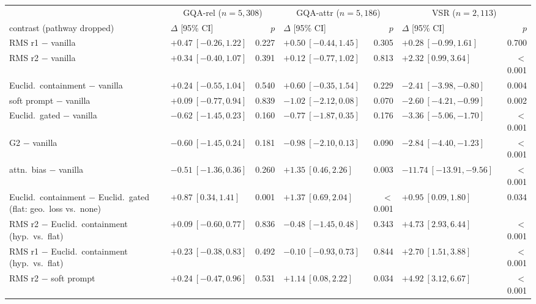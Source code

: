 \begin{tabular}{@{}l lr lr lr@{}}
\toprule
 & \multicolumn{2}{c}{GQA-rel ($n{=}5{,}308$)} & \multicolumn{2}{c}{GQA-attr ($n{=}5{,}186$)} & \multicolumn{2}{c}{VSR ($n{=}2{,}113$)} \\
\cmidrule(lr){2-3}\cmidrule(lr){4-5}\cmidrule(lr){6-7}
contrast (pathway dropped) & $\Delta$ [95\% CI] & $p$ & $\Delta$ [95\% CI] & $p$ & $\Delta$ [95\% CI] & $p$ \\
\midrule
RMS r1 $-$ vanilla & $+0.47\ [-0.26, 1.22]$ & 0.227 & $+0.50\ [-0.44, 1.45]$ & 0.305 & $+0.28\ [-0.99, 1.61]$ & 0.700 \\
RMS r2 $-$ vanilla & $+0.34\ [-0.40, 1.07]$ & 0.391 & $+0.12\ [-0.77, 1.02]$ & 0.813 & $+2.32\ [0.99, 3.64]$ & $<$0.001 \\
Euclid.\ containment $-$ vanilla & $+0.24\ [-0.55, 1.04]$ & 0.540 & $+0.60\ [-0.35, 1.54]$ & 0.229 & $-2.41\ [-3.98, -0.80]$ & 0.004 \\
soft prompt $-$ vanilla & $+0.09\ [-0.77, 0.94]$ & 0.839 & $-1.02\ [-2.12, 0.08]$ & 0.070 & $-2.60\ [-4.21, -0.99]$ & 0.002 \\
Euclid.\ gated $-$ vanilla & $-0.62\ [-1.45, 0.23]$ & 0.160 & $-0.77\ [-1.87, 0.35]$ & 0.176 & $-3.36\ [-5.06, -1.70]$ & $<$0.001 \\
G2 $-$ vanilla & $-0.60\ [-1.45, 0.24]$ & 0.181 & $-0.98\ [-2.10, 0.13]$ & 0.090 & $-2.84\ [-4.40, -1.23]$ & $<$0.001 \\
attn.\ bias $-$ vanilla & $-0.51\ [-1.36, 0.36]$ & 0.260 & $+1.35\ [0.46, 2.26]$ & 0.003 & $-11.74\ [-13.91, -9.56]$ & $<$0.001 \\
Euclid.\ containment $-$ Euclid.\ gated (flat: geo.\ loss vs.\ none) & $+0.87\ [0.34, 1.41]$ & 0.001 & $+1.37\ [0.69, 2.04]$ & $<$0.001 & $+0.95\ [0.09, 1.80]$ & 0.034 \\
RMS r2 $-$ Euclid.\ containment (hyp.\ vs.\ flat) & $+0.09\ [-0.60, 0.77]$ & 0.836 & $-0.48\ [-1.45, 0.48]$ & 0.343 & $+4.73\ [2.93, 6.44]$ & $<$0.001 \\
RMS r1 $-$ Euclid.\ containment (hyp.\ vs.\ flat) & $+0.23\ [-0.38, 0.83]$ & 0.492 & $-0.10\ [-0.93, 0.73]$ & 0.844 & $+2.70\ [1.51, 3.88]$ & $<$0.001 \\
RMS r2 $-$ soft prompt & $+0.24\ [-0.47, 0.96]$ & 0.531 & $+1.14\ [0.08, 2.22]$ & 0.034 & $+4.92\ [3.12, 6.67]$ & $<$0.001 \\
\bottomrule
\end{tabular}
